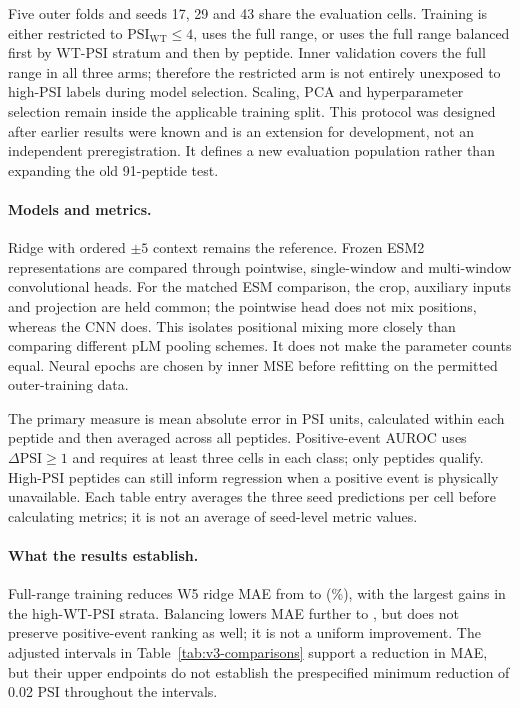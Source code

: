 Five outer folds and seeds 17, 29 and 43 share the evaluation cells. Training is either restricted
to $\mathrm{PSI}_{\mathrm{WT}}\le4$, uses the full range, or uses the full range balanced first by
WT-PSI stratum and then by peptide. Inner validation covers the full range in all three arms;
therefore the restricted arm is not entirely unexposed to high-PSI labels during model selection.
Scaling, PCA and hyperparameter selection remain inside the applicable training split. This protocol
was designed after earlier results were known and is an extension for development, not an independent
preregistration. It defines a new evaluation population rather than expanding the old 91-peptide test.

\paragraph{Models and metrics.}
Ridge with ordered $\pm5$ context remains the reference. Frozen ESM2 representations
\citep{lin2023esm} are compared through pointwise, single-window and multi-window convolutional heads.
For the matched ESM comparison, the crop, auxiliary inputs and projection are held common; the
pointwise head does not mix positions, whereas the CNN does. This isolates positional mixing more
closely than comparing different pLM pooling schemes. It does not make the parameter counts equal.
Neural epochs are chosen by inner MSE before refitting on the permitted outer-training data.

The primary measure is mean absolute error in PSI units, calculated within each peptide and then
averaged across all \nVthreeNPeptides{} peptides. Positive-event AUROC uses
$\Delta\mathrm{PSI}\ge1$ and requires at least three cells in each class; only
\nVthreePlusEligible{} peptides qualify. High-PSI peptides can still inform regression when a positive
event is physically unavailable. Each table entry averages the three seed predictions per cell
before calculating metrics; it is not an average of seed-level metric values.

\begin{table}[htbp]
  \centering
  \caption{Selected full-PSI development results. MAE is lower-is-better; positive AUROC is higher-is-better.
  All rows use the same evaluation population and three-seed prediction ensemble.}
  \label{tab:v3-results}
  
\end{table}

\paragraph{What the results establish.}
Full-range training reduces W5 ridge MAE from \nVthreeRidgeB{} to \nVthreeRidgeD{}
(\nVthreeRidgeGain\%), with the largest gains in the high-WT-PSI strata. Balancing lowers MAE
further to \nVthreeRidgeE{}, but does not preserve positive-event ranking as well; it is not a
uniform improvement. The adjusted intervals in Table~\ref{tab:v3-comparisons} support a reduction
in MAE, but their upper endpoints do not establish the prespecified minimum reduction of 0.02 PSI
throughout the intervals.

